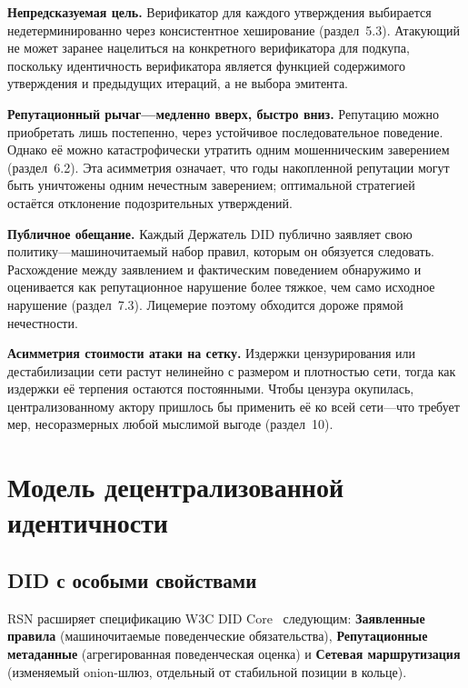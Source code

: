 \documentclass[11pt,a4paper,twocolumn]{article}
\begin{document}
\textbf{Непредсказуемая цель.} Верификатор для каждого утверждения выбирается недетерминированно через консистентное хеширование (раздел~5.3). Атакующий не может заранее нацелиться на конкретного верификатора для подкупа, поскольку идентичность верификатора является функцией содержимого утверждения и предыдущих итераций, а не выбора эмитента.

\textbf{Репутационный рычаг---медленно вверх, быстро вниз.} Репутацию можно приобретать лишь постепенно, через устойчивое последовательное поведение. Однако её можно катастрофически утратить одним мошенническим заверением (раздел~6.2). Эта асимметрия означает, что годы накопленной репутации могут быть уничтожены одним нечестным заверением; оптимальной стратегией остаётся отклонение подозрительных утверждений.

\textbf{Публичное обещание.} Каждый Держатель DID публично заявляет свою политику---машиночитаемый набор правил, которым он обязуется следовать. Расхождение между заявлением и фактическим поведением обнаружимо и оценивается как репутационное нарушение более тяжкое, чем само исходное нарушение (раздел~7.3). Лицемерие поэтому обходится дороже прямой нечестности.

\textbf{Асимметрия стоимости атаки на сетку.} Издержки цензурирования или дестабилизации сети растут нелинейно с размером и плотностью сети, тогда как издержки её терпения остаются постоянными. Чтобы цензура окупилась, централизованному актору пришлось бы применить её ко всей сети---что требует мер, несоразмерных любой мыслимой выгоде (раздел~10).

\section{Модель децентрализованной идентичности}

\subsection{DID с особыми свойствами}

RSN расширяет спецификацию W3C DID Core~\cite{did2022} следующим: \textbf{Заявленные правила} (машиночитаемые поведенческие обязательства), \textbf{Репутационные метаданные} (агрегированная поведенческая оценка) и \textbf{Сетевая маршрутизация} (изменяемый onion-шлюз, отдельный от стабильной позиции в кольце).
\end{document}
